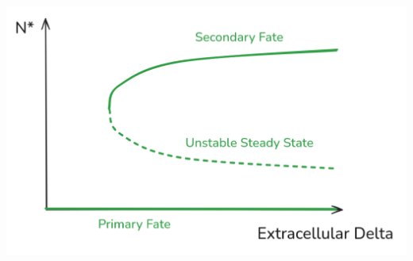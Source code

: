\documentclass{article}
\begin{document}
\begin{flushleft}
\includegraphics[width=\textwidth]{bifurcation-diagram}

\end{flushleft}
\end{document}
